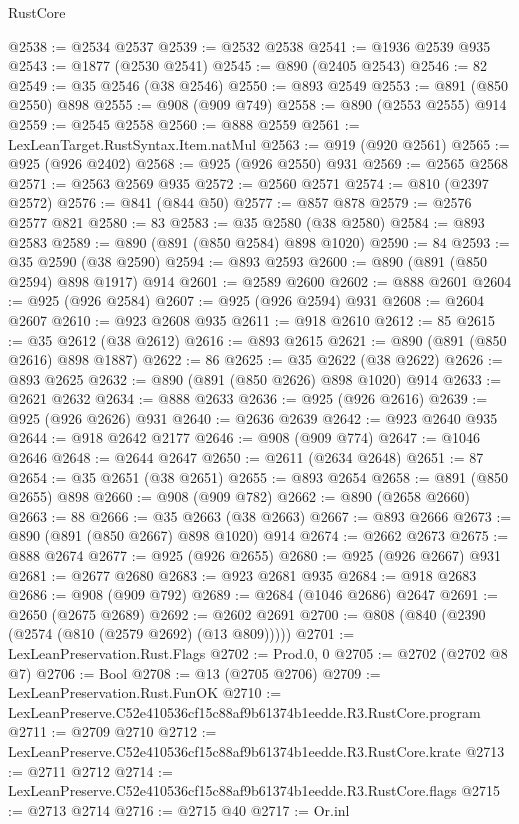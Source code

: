 \begin{lexlean}{RustCore}
\begin{coremodule}
@2538 := @2534 @2537
@2539 := @2532 @2538
@2541 := @1936 @2539 @935
@2543 := @1877 (@2530 @2541)
@2545 := @890 (@2405 @2543)
@2546 := 82
@2549 := @35 @2546 (@38 @2546)
@2550 := @893 @2549
@2553 := @891 (@850 @2550) @898
@2555 := @908 (@909 @749)
@2558 := @890 (@2553 @2555) @914
@2559 := @2545 @2558
@2560 := @888 @2559
@2561 := LexLeanTarget.RustSyntax.Item.natMul
@2563 := @919 (@920 @2561)
@2565 := @925 (@926 @2402)
@2568 := @925 (@926 @2550) @931
@2569 := @2565 @2568
@2571 := @2563 @2569 @935
@2572 := @2560 @2571
@2574 := @810 (@2397 @2572)
@2576 := @841 (@844 @50)
@2577 := @857 @878
@2579 := @2576 @2577 @821
@2580 := 83
@2583 := @35 @2580 (@38 @2580)
@2584 := @893 @2583
@2589 := @890 (@891 (@850 @2584) @898 @1020)
@2590 := 84
@2593 := @35 @2590 (@38 @2590)
@2594 := @893 @2593
@2600 := @890 (@891 (@850 @2594) @898 @1917) @914
@2601 := @2589 @2600
@2602 := @888 @2601
@2604 := @925 (@926 @2584)
@2607 := @925 (@926 @2594) @931
@2608 := @2604 @2607
@2610 := @923 @2608 @935
@2611 := @918 @2610
@2612 := 85
@2615 := @35 @2612 (@38 @2612)
@2616 := @893 @2615
@2621 := @890 (@891 (@850 @2616) @898 @1887)
@2622 := 86
@2625 := @35 @2622 (@38 @2622)
@2626 := @893 @2625
@2632 := @890 (@891 (@850 @2626) @898 @1020) @914
@2633 := @2621 @2632
@2634 := @888 @2633
@2636 := @925 (@926 @2616)
@2639 := @925 (@926 @2626) @931
@2640 := @2636 @2639
@2642 := @923 @2640 @935
@2644 := @918 @2642 @2177
@2646 := @908 (@909 @774)
@2647 := @1046 @2646
@2648 := @2644 @2647
@2650 := @2611 (@2634 @2648)
@2651 := 87
@2654 := @35 @2651 (@38 @2651)
@2655 := @893 @2654
@2658 := @891 (@850 @2655) @898
@2660 := @908 (@909 @782)
@2662 := @890 (@2658 @2660)
@2663 := 88
@2666 := @35 @2663 (@38 @2663)
@2667 := @893 @2666
@2673 := @890 (@891 (@850 @2667) @898 @1020) @914
@2674 := @2662 @2673
@2675 := @888 @2674
@2677 := @925 (@926 @2655)
@2680 := @925 (@926 @2667) @931
@2681 := @2677 @2680
@2683 := @923 @2681 @935
@2684 := @918 @2683
@2686 := @908 (@909 @792)
@2689 := @2684 (@1046 @2686) @2647
@2691 := @2650 (@2675 @2689)
@2692 := @2602 @2691
@2700 := @808 (@840 (@2390 (@2574 (@810 (@2579 @2692) (@13 @809)))))
@2701 := LexLeanPreservation.Rust.Flags
@2702 := Prod.{0, 0}
@2705 := @2702 (@2702 @8 @7)
@2706 := Bool
@2708 := @13 (@2705 @2706)
@2709 := LexLeanPreservation.Rust.FunOK
@2710 := LexLeanPreserve.C52e410536cf15c88af9b61374b1eedde.R3.RustCore.program
@2711 := @2709 @2710
@2712 := LexLeanPreserve.C52e410536cf15c88af9b61374b1eedde.R3.RustCore.krate
@2713 := @2711 @2712
@2714 := LexLeanPreserve.C52e410536cf15c88af9b61374b1eedde.R3.RustCore.flags
@2715 := @2713 @2714
@2716 := @2715 @40
@2717 := Or.inl

\end{coremodule}
\end{lexlean}
